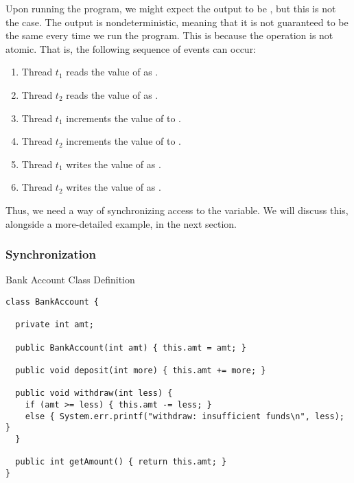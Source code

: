 Upon running the program, we might expect the output to be , but this is not the case. The output is nondeterministic, meaning that it is not guaranteed to be the same every time we run the program. This is because the  operation is not atomic. That is, the following sequence of events can occur:

\begin{enumerate}
  \item Thread $t_1$ reads the value of  as .
  \item Thread $t_2$ reads the value of  as .
  \item Thread $t_1$ increments the value of  to .
  \item Thread $t_2$ increments the value of  to .
  \item Thread $t_1$ writes the value of  as .
  \item Thread $t_2$ writes the value of  as .
\end{enumerate}

Thus, we need a way of synchronizing access to the  variable. We will discuss this, alongside a more-detailed example, in the next section.

\subsubsection*{Synchronization}


\begin{cl}{Bank Account Class Definition}
\begin{lstlisting}[language=MyJava]
class BankAccount {

  private int amt;

  public BankAccount(int amt) { this.amt = amt; }

  public void deposit(int more) { this.amt += more; }

  public void withdraw(int less) {
    if (amt >= less) { this.amt -= less; }
    else { System.err.printf("withdraw: insufficient funds\n", less); }
  }

  public int getAmount() { return this.amt; }
}
\end{lstlisting}
\end{cl}

